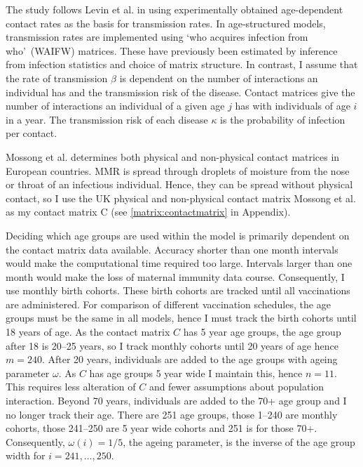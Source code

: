 \documentclass[a4paper,11pt] {scrartcl}
\begin{document}
The study follows Levin et al.\cite{levin2011global} in using experimentally obtained age-dependent contact rates as the basis for transmission rates. In age-structured models, transmission rates are implemented using `who acquires infection from who'\ (WAIFW) matrices\cite{anderson1985age, keeling2011modeling}. These have previously been estimated by inference from infection statistics and choice of matrix structure\cite{edmunds2000pre}. In contrast, I assume that the rate of transmission $\beta$ is dependent on the number of interactions an individual has and the transmission risk of the disease. Contact matrices give the number of interactions an individual of a given age $j$ has with individuals of age $i$ in a year. The transmission risk of each disease $\kappa$ is the probability of infection per contact.

 Mossong et al.\cite{mossong2008social} determines both physical and non-physical contact matrices in European countries. MMR is spread through droplets of moisture from the nose or throat of an infectious individual\cite{nhschoicesmeasles,nhschoicesmumps,nhschoicesrubella}. Hence, they can be spread without physical contact, so I use the UK physical and non-physical contact matrix Mossong et al.\cite{mossong2008social} as my contact matrix C (see \autoref{matrix:contactmatrix} in Appendix).

Deciding which age groups are used within the model is primarily dependent on the contact matrix data available. Accuracy shorter than one month intervals would make the computational time required too large. Intervals larger than one month would make the loss of maternal immunity data course. Consequently, I use monthly birth cohorts. These birth cohorts are tracked until all vaccinations are administered. For comparison of different vaccination schedules, the age groups must be the same in all models, hence I must track the birth cohorts until 18 years of age. As the contact matrix $C$ has 5 year age groups, the age group after 18 is 20--25 years, so I track monthly cohorts until 20 years of age hence $m=240$. After 20 years, individuals are added to the age groups with ageing parameter $\omega$. As $C$ has age groups 5 year wide I maintain this, hence $n=11$. This requires less alteration of $C$ and fewer assumptions about population interaction. Beyond 70 years, individuals are added to the 70+ age group and I no longer track their age. There are 251 age groups, those 1--240 are monthly cohorts, those 241--250 are 5 year wide cohorts and 251 is for those 70+. Consequently, $\omega(i)=1/5$, the ageing parameter, is the inverse of the age group width for $i=241,\dots,250$.
\end{document}
